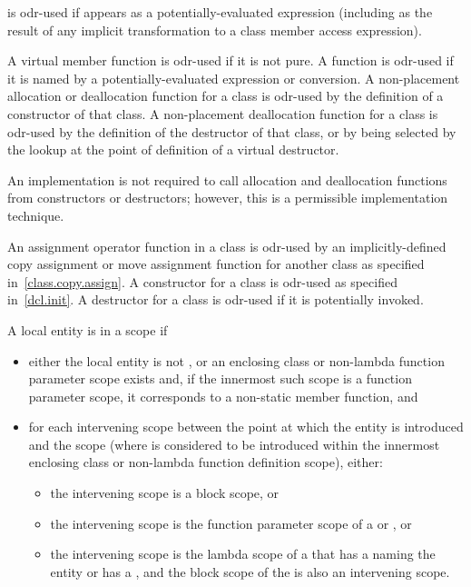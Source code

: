 \pnum
{} is odr-used if  appears as a potentially-evaluated expression
(including as the result of any implicit transformation to
a class member access expression).

\pnum
A virtual member
function is odr-used if it is not pure.
A function is odr-used if it is named by
a potentially-evaluated expression or conversion.
A non-placement allocation or deallocation
function for a class is odr-used by the definition of a constructor of that
class. A non-placement deallocation function for a class is odr-used by the
definition of the destructor of that class, or by being selected by the
lookup at the point of definition of a virtual
destructor.
\begin{footnote}
An implementation is not required
to call allocation and
deallocation functions from constructors or destructors; however, this
is a permissible implementation technique.
\end{footnote}

\pnum
An assignment operator function in a class is odr-used by an
implicitly-defined
copy assignment or move assignment function for another class as specified
in~\ref{class.copy.assign}.
A constructor for a class is odr-used as specified
in~\ref{dcl.init}. A destructor for a class is odr-used if it is potentially
invoked.

\pnum
A local entity
is  in a scope if
\begin{itemize}
\item either the local entity is not , or
an enclosing class or non-lambda function parameter scope exists and,
if the innermost such scope is a function parameter scope,
it corresponds to a non-static member function, and
\item
for each intervening scope
between the point at which the entity is introduced and the scope
(where  is considered to be introduced
within the innermost enclosing class or non-lambda function definition scope),
either:
\begin{itemize}
\item the intervening scope is a block scope, or
\item the intervening scope is the function parameter scope of
a  or , or
\item the intervening scope is the lambda scope of
a 
that has a 
naming the entity or has a , and
the block scope of the 
is also an intervening scope.
\end{itemize}
\end{itemize}

